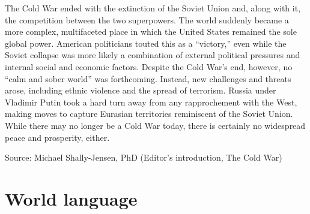 \documentclass[
  openany]{book}
\begin{document}
The Cold War ended with the extinction of the Soviet Union and, along with it, the competition between the two superpowers. The world suddenly became a more complex, multifaceted place in which the United States remained the sole global power. American politicians touted this as a ``victory,'' even while the Soviet collapse was more likely a combination of external political pressures and internal social and economic factors. Despite the Cold War's end, however, no ``calm and sober world'' was forthcoming. Instead, new challenges and threats arose, including ethnic violence and the spread of terrorism. Russia under Vladimir Putin took a hard turn away from any rapprochement with the West, making moves to capture Eurasian territories reminiscent of the Soviet Union. While there may no longer be a Cold War today, there is certainly no widespread peace and prosperity, either.

Source: Michael Shally-Jensen, PhD (Editor's introduction, The Cold War)

\hypertarget{world-language}{%
\section{World language}\label{world-language}}
\end{document}

